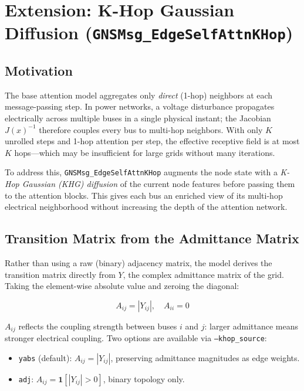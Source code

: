 \documentclass{article}
\begin{document}
\section{Extension: K-Hop Gaussian Diffusion
  (\texttt{GNSMsg\_EdgeSelfAttnKHop})}

\subsection{Motivation}

The base attention model aggregates only \emph{direct} (1-hop) neighbors at
each message-passing step.  In power networks, a voltage disturbance
propagates electrically across multiple buses in a single physical instant;
the Jacobian $J(x)^{-1}$ therefore couples every bus to multi-hop
neighbors.  With only $K$ unrolled steps and 1-hop attention per step, the
effective receptive field is at most $K$ hops---which may be insufficient for
large grids without many iterations.

To address this, \texttt{GNSMsg\_EdgeSelfAttnKHop} augments the node state
with a \emph{K-Hop Gaussian (KHG) diffusion} \cite{zhang2026khg} of the
current node features before passing them to the attention blocks.  This
gives each bus an enriched view of its multi-hop electrical neighborhood
without increasing the depth of the attention network.

\subsection{Transition Matrix from the Admittance Matrix}

Rather than using a raw (binary) adjacency matrix, the model derives the
transition matrix directly from $Y$, the complex admittance matrix of the
grid.  Taking the element-wise absolute value and zeroing the diagonal:

\begin{equation}
  A_{ij} = |Y_{ij}|, \quad A_{ii} = 0
\end{equation}

$A_{ij}$ reflects the coupling strength between buses $i$ and $j$:
larger admittance means stronger electrical coupling.  Two options are
available via \texttt{--khop\_source}:
\begin{itemize}[noitemsep]
  \item \texttt{yabs} (default): $A_{ij} = |Y_{ij}|$, preserving
    admittance magnitudes as edge weights.
  \item \texttt{adj}: $A_{ij} = \mathbf{1}[|Y_{ij}| > 0]$, binary
    topology only.
\end{itemize}
\end{document}
